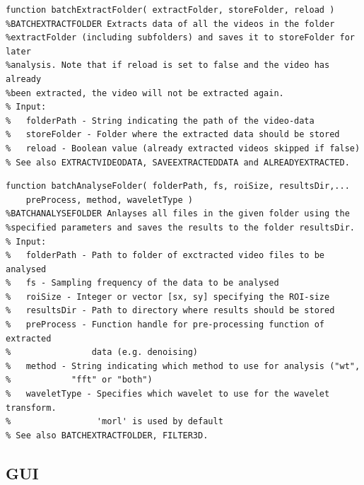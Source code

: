 \documentclass[11pt]{scrartcl}
\begin{document}
\begin{minipage}{\linewidth}
  \begin{lstlisting}[caption={Function for extracting data from videos.}, label=list:res]
function batchExtractFolder( extractFolder, storeFolder, reload )
%BATCHEXTRACTFOLDER Extracts data of all the videos in the folder 
%extractFolder (including subfolders) and saves it to storeFolder for later 
%analysis. Note that if reload is set to false and the video has already 
%been extracted, the video will not be extracted again.
% Input:
%   folderPath - String indicating the path of the video-data
%   storeFolder - Folder where the extracted data should be stored
%   reload - Boolean value (already extracted videos skipped if false)
% See also EXTRACTVIDEODATA, SAVEEXTRACTEDDATA and ALREADYEXTRACTED.
\end{lstlisting}
\end{minipage}

\begin{minipage}{\linewidth}
  \begin{lstlisting}[caption={Function for analysing extracted data.}, label=list:res]
function batchAnalyseFolder( folderPath, fs, roiSize, resultsDir,...
    preProcess, method, waveletType )
%BATCHANALYSEFOLDER Anlayses all files in the given folder using the
%specified parameters and saves the results to the folder resultsDir.
% Input:
%   folderPath - Path to folder of exctracted video files to be analysed
%   fs - Sampling frequency of the data to be analysed
%   roiSize - Integer or vector [sx, sy] specifying the ROI-size
%   resultsDir - Path to directory where results should be stored
%   preProcess - Function handle for pre-processing function of extracted
%                data (e.g. denoising)
%   method - String indicating which method to use for analysis ("wt",
%            "fft" or "both")
%   waveletType - Specifies which wavelet to use for the wavelet transform.
%                 'morl' is used by default
% See also BATCHEXTRACTFOLDER, FILTER3D.
\end{lstlisting}
\end{minipage}


\subsection{GUI}


\end{document}
